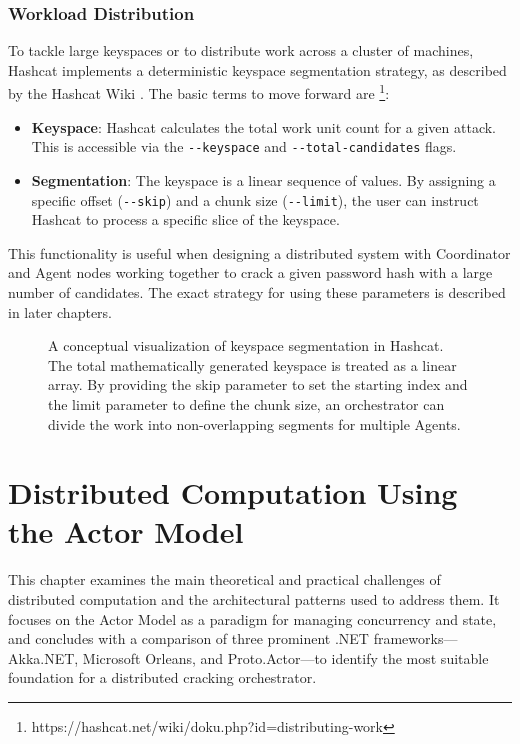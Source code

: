 \subsection{Workload Distribution}

To tackle large keyspaces or to distribute work across a cluster of machines, Hashcat implements a deterministic keyspace segmentation strategy, as described by the Hashcat Wiki \cite{hashcat_wiki}. The basic terms to move forward are \footnote{https://hashcat.net/wiki/doku.php?id=distributing-work}:

\begin{itemize}
    \item \textbf{Keyspace}: Hashcat calculates the total work unit count for a given attack. This is accessible via the \verb|--keyspace| and \verb|--total-candidates| flags.

    \item \textbf{Segmentation}: The keyspace is a linear sequence of values. By assigning a specific offset (\verb|--skip|) and a chunk size (\verb|--limit|), the user can instruct Hashcat to process a specific slice of the keyspace.
\end{itemize}

This functionality is useful when designing a distributed system with Coordinator and Agent nodes working together to crack a given password hash with a large number of candidates. The exact strategy for using these parameters is described in later chapters.

\begin{figure}[H]
\centering

\caption{A conceptual visualization of keyspace segmentation in Hashcat. The total mathematically generated keyspace is treated as a linear array. By providing the skip parameter to set the starting index and the limit parameter to define the chunk size, an orchestrator can divide the work into non-overlapping segments for multiple Agents.}
\label{fig:keyspace_segmentation}
\end{figure}


\chapter{Distributed Computation Using the Actor Model}

This chapter examines the main theoretical and practical challenges of distributed computation and the architectural patterns used to address them. It focuses on the Actor Model as a paradigm for managing concurrency and state, and concludes with a comparison of three prominent .NET frameworks—Akka.NET, Microsoft Orleans, and Proto.Actor—to identify the most suitable foundation for a distributed cracking orchestrator.

